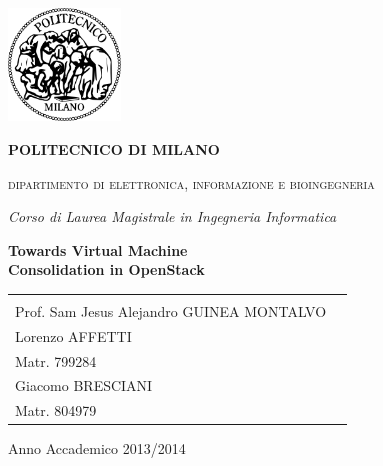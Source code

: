 \begin{titlepage}
 \begin{center}
 \includegraphics[width=3cm]{images/logo_polimi.png}
 {\begin{center}
 \begin{LARGE}
 \textbf{\uppercase{politecnico di milano}}
 \end{LARGE}
 \begin{large}
 \textsc{
 dipartimento di elettronica, informazione e bioingegneria
 }
 \end{large}
 \end{center}
 }
 \vspace*{0.3cm}
 {\Large 
 \emph{Corso di Laurea Magistrale in Ingegneria Informatica\\[1.3cm]}
 }
 \begin{Huge}
 \textbf{Towards Virtual Machine\\[0.4cm]
 Consolidation in OpenStack
 }
 \end{Huge}
 \vfill
 \begin{minipage}{.99\linewidth}
 \begin{tabular}{l r}
 \begin{minipage}{.4\linewidth}
 \begin{flushleft}
 {\large
 RELATORE\\[.3cm]
 Prof. Sam Jesus Alejandro GUINEA MONTALVO
 }
 \end{flushleft}
 \end{minipage}
 &
 \begin{minipage}{.6\linewidth}
 \begin{flushright}
 {\large
 TESI DI LAUREA DI\\[.3cm]
 Lorenzo AFFETTI\\
 Matr. 799284\\[.3cm]
 Giacomo BRESCIANI\\
 Matr. 804979
 }
 \end{flushright}
 \end{minipage}
 \end{tabular}
 \end{minipage}
 \vfill
 {\large{{Anno Accademico 2013/2014}}}
 \end{center}
\end{titlepage}
\cleardoublepage

